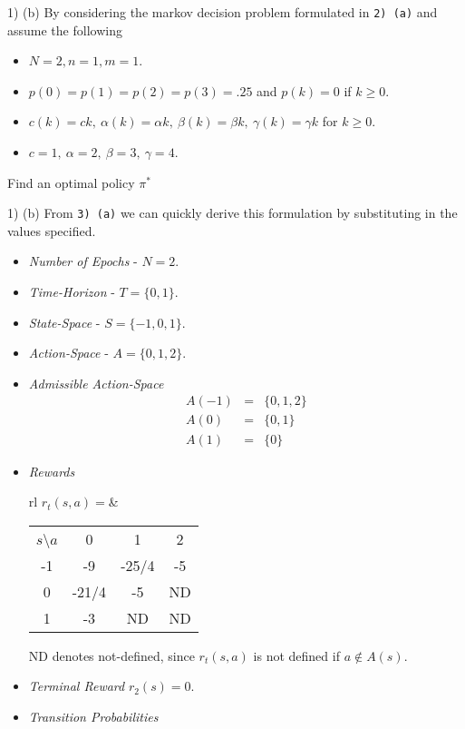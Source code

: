 \documentclass[11pt,a4paper]{article}
\begin{document}
\begin{question}{1) (b)}
  By considering the markov decision problem formulated in \texttt{2) (a)}  and assume the following
  \begin{itemize}
    \item $N=2,n=1,m=1$.
    \item $p(0)=p(1)=p(2)=p(3)=.25$ and $p(k)=0$ if $k\geq0$.
    \item $c(k)=ck,\ \alpha(k)=\alpha k,\ \beta(k)=\beta k,\ \gamma(k)=\gamma k$ for $k\geq 0$.
    \item $c=1,\ \alpha=2,\ \beta=3,\ \gamma=4$.
  \end{itemize}
  Find an optimal policy $\pi^*$
\end{question}

\begin{answer}{1) (b)}
  From \texttt{3) (a)} we can quickly derive this formulation by substituting in the values specified.
  \begin{itemize}
    \item \textit{Number of Epochs} - $N=2$.
    \item \textit{Time-Horizon} - $T=\{0,1\}$.
    \item \textit{State-Space} - $S=\{-1,0,1\}$.
    \item \textit{Action-Space} - $A=\{0,1,2\}$.
    \item \textit{Admissible Action-Space}
    \[\begin{array}{rcl}
      A(-1)&=&\{0,1,2\}\\
      A(0)&=&\{0,1\}\\
      A(1)&=&\{0\}
    \end{array}\]
    \item \textit{Rewards}
    \begin{center}
      \begin{tabular}{rl}
        $r_t(s,a)=$&
        \begin{tabular}{c|ccc}
          $s$\textbackslash $a$&0&1&2\\
          -1&-9&-25/4&-5\\
          0&-21/4&-5&ND\\
          1&-3&ND&ND
        \end{tabular}
      \end{tabular}
    \end{center}
    ND denotes not-defined, since $r_t(s,a)$ is not defined if $a\not\in A(s)$.
    \item \textit{Terminal Reward} $r_2(s)=0$.
    \item \textit{Transition Probabilities}

\end{itemize}
\end{answer}
\end{document}
